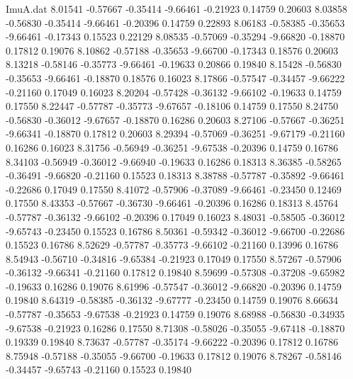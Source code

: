 \begin{filecontents}{ImuA.dat}
   8.01541   -0.57667   -0.35414   -9.66461   -0.21923    0.14759    0.20603
   8.03858   -0.56830   -0.35414   -9.66461   -0.20396    0.14759    0.22893
   8.06183   -0.58385   -0.35653   -9.66461   -0.17343    0.15523    0.22129
   8.08535   -0.57069   -0.35294   -9.66820   -0.18870    0.17812    0.19076
   8.10862   -0.57188   -0.35653   -9.66700   -0.17343    0.18576    0.20603
   8.13218   -0.58146   -0.35773   -9.66461   -0.19633    0.20866    0.19840
   8.15428   -0.56830   -0.35653   -9.66461   -0.18870    0.18576    0.16023
   8.17866   -0.57547   -0.34457   -9.66222   -0.21160    0.17049    0.16023
   8.20204   -0.57428   -0.36132   -9.66102   -0.19633    0.14759    0.17550
   8.22447   -0.57787   -0.35773   -9.67657   -0.18106    0.14759    0.17550
   8.24750   -0.56830   -0.36012   -9.67657   -0.18870    0.16286    0.20603
   8.27106   -0.57667   -0.36251   -9.66341   -0.18870    0.17812    0.20603
   8.29394   -0.57069   -0.36251   -9.67179   -0.21160    0.16286    0.16023
   8.31756   -0.56949   -0.36251   -9.67538   -0.20396    0.14759    0.16786
   8.34103   -0.56949   -0.36012   -9.66940   -0.19633    0.16286    0.18313
   8.36385   -0.58265   -0.36491   -9.66820   -0.21160    0.15523    0.18313
   8.38788   -0.57787   -0.35892   -9.66461   -0.22686    0.17049    0.17550
   8.41072   -0.57906   -0.37089   -9.66461   -0.23450    0.12469    0.17550
   8.43353   -0.57667   -0.36730   -9.66461   -0.20396    0.16286    0.18313
   8.45764   -0.57787   -0.36132   -9.66102   -0.20396    0.17049    0.16023
   8.48031   -0.58505   -0.36012   -9.65743   -0.23450    0.15523    0.16786
   8.50361   -0.59342   -0.36012   -9.66700   -0.22686    0.15523    0.16786
   8.52629   -0.57787   -0.35773   -9.66102   -0.21160    0.13996    0.16786
   8.54943   -0.56710   -0.34816   -9.65384   -0.21923    0.17049    0.17550
   8.57267   -0.57906   -0.36132   -9.66341   -0.21160    0.17812    0.19840
   8.59699   -0.57308   -0.37208   -9.65982   -0.19633    0.16286    0.19076
   8.61996   -0.57547   -0.36012   -9.66820   -0.20396    0.14759    0.19840
   8.64319   -0.58385   -0.36132   -9.67777   -0.23450    0.14759    0.19076
   8.66634   -0.57787   -0.35653   -9.67538   -0.21923    0.14759    0.19076
   8.68988   -0.56830   -0.34935   -9.67538   -0.21923    0.16286    0.17550
   8.71308   -0.58026   -0.35055   -9.67418   -0.18870    0.19339    0.19840
   8.73637   -0.57787   -0.35174   -9.66222   -0.20396    0.17812    0.16786
   8.75948   -0.57188   -0.35055   -9.66700   -0.19633    0.17812    0.19076
   8.78267   -0.58146   -0.34457   -9.65743   -0.21160    0.15523    0.19840

\end{filecontents}
